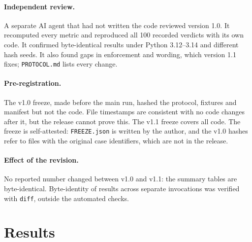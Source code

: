 \documentclass[11pt]{article}
\newcommand{\code}[1]{\texttt{#1}}
\begin{document}
\paragraph{Independent review.} A separate AI agent that had not written the code reviewed version 1.0. It recomputed every metric and reproduced all 100 recorded verdicts with its own code. It confirmed byte-identical results under Python 3.12--3.14 and different hash seeds. It also found gaps in enforcement and wording, which version 1.1 fixes; \code{PROTOCOL.md} lists every change.

\paragraph{Pre-registration.} The v1.0 freeze, made before the main run, hashed the protocol, fixtures and manifest but not the code. File timestamps are consistent with no code changes after it, but the release cannot prove this. The v1.1 freeze covers all code. The freeze is self-attested: \code{FREEZE.json} is written by the author, and the v1.0 hashes refer to files with the original case identifiers, which are not in the release.

\paragraph{Effect of the revision.} No reported number changed between v1.0 and v1.1: the summary tables are byte-identical. Byte-identity of results across separate invocations was verified with \code{diff}, outside the automated checks.

\section{Results}
\end{document}
